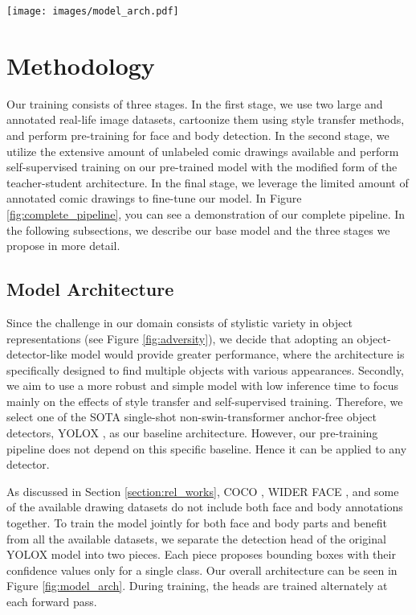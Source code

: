\documentclass{article}
\begin{document}
\begin{figure*}[ht]
    \centering
    \texttt{[image: images/model\_arch.pdf]}
    \caption{Our complete model architecture.}
    \label{fig:model_arch}
\end{figure*}

\section{Methodology}
\label{section:methodology}

Our training consists of three stages. In the first stage, we use two large and annotated real-life image datasets, cartoonize them using style transfer methods, and perform pre-training for face and body detection. In the second stage, we utilize the extensive amount of unlabeled comic drawings available and perform self-supervised training on our pre-trained model with the modified form of the teacher-student architecture. In the final stage, we leverage the limited amount of annotated comic drawings to fine-tune our model. In Figure \ref{fig:complete_pipeline}, you can see a demonstration of our complete pipeline. In the following subsections, we describe our base model and the three stages we propose in more detail.

\subsection{Model Architecture}
\label{subsection:model_arch}

Since the challenge in our domain consists of stylistic variety in object representations (see Figure \ref{fig:adversity}), we decide that adopting an object-detector-like model would provide greater performance, where the architecture is specifically designed to find multiple objects with various appearances. Secondly, we aim to use a more robust and simple model with low inference time to focus mainly on the effects of style transfer and self-supervised training. Therefore, we select one of the SOTA single-shot non-swin-transformer anchor-free object detectors, YOLOX \cite{yolox2021}, as our baseline architecture. However, our pre-training pipeline does not depend on this specific baseline. Hence it can be applied to any detector.

As discussed in Section \ref{section:rel_works}, COCO \cite{lin2014microsoft}, WIDER FACE \cite{yang2016wider}, and some of the available drawing datasets do not include both face and body annotations together. To train the model jointly for both face and body parts and benefit from all the available datasets, we separate the detection head of the original YOLOX model into two pieces. Each piece proposes bounding boxes with their confidence values only for a single class. Our overall architecture can be seen in Figure \ref{fig:model_arch}. During training, the heads are trained alternately at each forward pass. 
\end{document}
